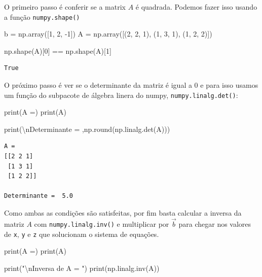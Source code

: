 \documentclass[
  brazilian,
  letterpaper,
  DIV=11,
  numbers=noendperiod]{scrreprt}
\newenvironment{Shaded}{\begin{snugshade}}{\end{snugshade}}
\newcommand{\BuiltInTok}[1]{\textcolor[rgb]{0.00,0.23,0.31}{#1}}
\newcommand{\CharTok}[1]{\textcolor[rgb]{0.13,0.47,0.30}{#1}}
\newcommand{\DecValTok}[1]{\textcolor[rgb]{0.68,0.00,0.00}{#1}}
\newcommand{\NormalTok}[1]{\textcolor[rgb]{0.00,0.23,0.31}{#1}}
\newcommand{\OperatorTok}[1]{\textcolor[rgb]{0.37,0.37,0.37}{#1}}
\newcommand{\StringTok}[1]{\textcolor[rgb]{0.13,0.47,0.30}{#1}}
\begin{document}
O primeiro passo é conferir se a matrix \(A\) é quadrada. Podemos fazer
isso usando a função \texttt{numpy.shape()}

\begin{Shaded}
\begin{Highlighting}[]
\NormalTok{b }\OperatorTok{=}\NormalTok{ np.array([}\DecValTok{1}\NormalTok{, }\DecValTok{2}\NormalTok{, }\OperatorTok{{-}}\DecValTok{1}\NormalTok{])}
\NormalTok{A }\OperatorTok{=}\NormalTok{ np.array([(}\DecValTok{2}\NormalTok{, }\DecValTok{2}\NormalTok{, }\DecValTok{1}\NormalTok{), (}\DecValTok{1}\NormalTok{, }\DecValTok{3}\NormalTok{, }\DecValTok{1}\NormalTok{), (}\DecValTok{1}\NormalTok{, }\DecValTok{2}\NormalTok{, }\DecValTok{2}\NormalTok{)])}

\NormalTok{np.shape(A)[}\DecValTok{0}\NormalTok{] }\OperatorTok{==}\NormalTok{ np.shape(A)[}\DecValTok{1}\NormalTok{]}
\end{Highlighting}
\end{Shaded}

\begin{verbatim}
True
\end{verbatim}

O próximo passo é ver se o determinante da matriz é igual a 0 e para
isso usamos um função do subpacote de álgebra linera do numpy,
\texttt{numpy.linalg.det()}:

\begin{Shaded}
\begin{Highlighting}[]
\BuiltInTok{print}\NormalTok{(}\StringTok{\textquotesingle{}A =\textquotesingle{}}\NormalTok{)}
\BuiltInTok{print}\NormalTok{(A)}

\BuiltInTok{print}\NormalTok{(}\StringTok{\textquotesingle{}}\CharTok{\textbackslash{}n}\StringTok{Determinante = \textquotesingle{}}\NormalTok{,np.}\BuiltInTok{round}\NormalTok{(np.linalg.det(A)))}
\end{Highlighting}
\end{Shaded}

\begin{verbatim}
A =
[[2 2 1]
 [1 3 1]
 [1 2 2]]

Determinante =  5.0
\end{verbatim}

Como ambas as condições são satisfeitas, por fim basta calcular a
inversa da matriz \(A\) com \texttt{numpy.linalg.inv()} e multiplicar
por \(\vec{b}\) para chegar nos valores de \texttt{x}, \texttt{y} e
\texttt{z} que solucionam o sistema de equações.

\begin{Shaded}
\begin{Highlighting}[]
\BuiltInTok{print}\NormalTok{(}\StringTok{\textquotesingle{}A =\textquotesingle{}}\NormalTok{)}
\BuiltInTok{print}\NormalTok{(A)}

\BuiltInTok{print}\NormalTok{(}\StringTok{"}\CharTok{\textbackslash{}n}\StringTok{Inversa de A = "}\NormalTok{)}
\BuiltInTok{print}\NormalTok{(np.linalg.inv(A))}
\end{Highlighting}
\end{Shaded}
\end{document}
